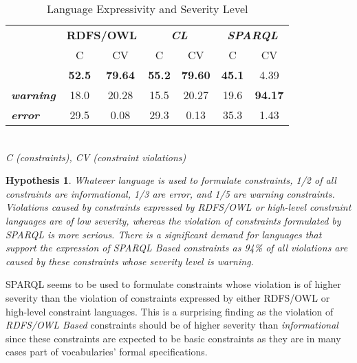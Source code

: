 \documentclass[conference]{IEEEtran}
\newtheorem{hyp}{Hypothesis}
\begin{document}
\begin{table}[H]
		\scriptsize
    \begin{center}
		\caption{Language Expressivity and Severity Level}
		\label{tab:evaluation-expressivity-severity}
    \begin{tabular}{@{}lcccccc@{}}
		\hline
    \multirow{3}{*}{} &
      \multicolumn{2}{c}{\textbf{RDFS/OWL}} &
      \multicolumn{2}{c}{\textbf{\emph{CL}}} &
      \multicolumn{2}{c}{\textbf{\emph{SPARQL}}} \\
    \textbf{} & C & CV & C & CV & C & CV \\
    \hline
		\textbf{\emph{info}} & \textbf{52.5} & \textbf{79.64} & \textbf{55.2} & \textbf{79.60} & \textbf{45.1} & 4.39 \\
		\textbf{\emph{warning}} & 18.0 & 20.28 & 15.5 & 20.27 & 19.6 & \textbf{94.17} \\
		\textbf{\emph{error}} & 29.5 & 0.08 & 29.3 & 0.13 & 35.3 & 1.43 \\
    \bottomrule
    \end{tabular}
		\\ \emph{C (constraints), CV (constraint violations)}
    \end{center}
\end{table}

\begin{hyp}
Whatever language is used to formulate constraints, 1/2 of all constraints are informational, 1/3 are error, and 1/5 are warning constraints. 
Violations caused by constraints expressed by RDFS/OWL or high-level constraint languages are of low severity, whereas the violation of constraints formulated by SPARQL is more serious.
There is a significant demand for languages that support the expression of SPARQL Based constraints as 94\% of all violations are caused by these constraints whose severity level is warning.
\end{hyp}

SPARQL seems to be used to formulate constraints whose violation is of higher severity than the violation of constraints expressed by either RDFS/OWL or high-level constraint languages. This is a surprising finding as the violation of \emph{RDFS/OWL Based} constraints should be of higher severity than \emph{informational} since these constraints are expected to be basic constraints as they are in many cases part of vocabularies' formal specifications. 
\end{document}
